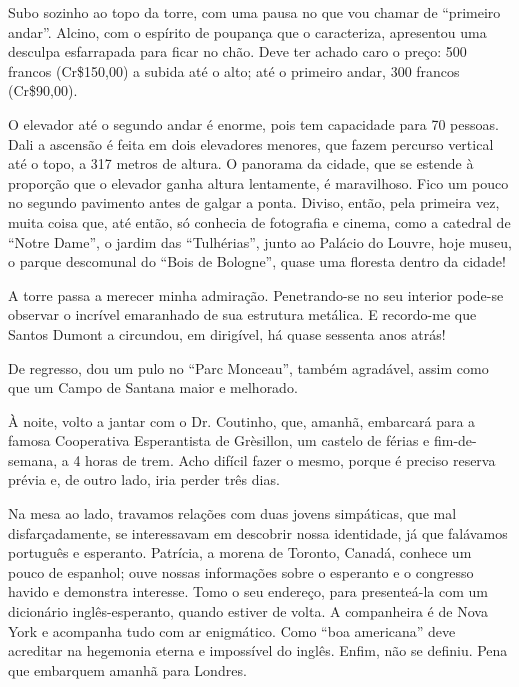 Subo sozinho ao topo da torre, com uma pausa no que vou chamar de ``primeiro andar''. Alcino, com o espírito de poupança que o caracteriza, apresentou uma desculpa esfarrapada para ficar no chão. Deve ter achado caro o preço: 500 francos (Cr\$150,00) a subida até o alto; até o primeiro andar, 300 francos (Cr\$90,00).

O elevador até o segundo andar é enorme, pois tem capacidade para 70 pessoas. Dali a ascensão é feita em dois elevadores menores, que fazem percurso vertical até o topo, a 317 metros de altura. O panorama da cidade, que se estende à proporção que o elevador ganha altura lentamente, é maravilhoso. Fico um pouco no segundo pavimento antes de galgar a ponta. Diviso, então, pela primeira vez, muita coisa que, até então, só conhecia de fotografia e cinema, como a catedral de ``Notre Dame'', o jardim das ``Tulhérias'', junto ao Palácio do Louvre, hoje museu, o parque descomunal do ``Bois de Bologne'', quase uma floresta dentro da cidade!

A torre passa a merecer minha admiração. Penetrando-se no seu interior pode-se observar o incrível emaranhado de sua estrutura metálica. E recordo-me que Santos Dumont a circundou, em dirigível, há quase sessenta anos atrás!

De regresso, dou um pulo no ``Parc Monceau'', também agradável, assim como que um Campo de Santana maior e melhorado.

À noite, volto a jantar com o Dr. Coutinho, que, amanhã, embarcará para a famosa Cooperativa Esperantista de Grèsillon, um castelo de férias e fim-de-semana, a 4 horas de trem. Acho difícil fazer o mesmo, porque é preciso reserva prévia e, de outro lado, iria perder três dias.

Na mesa ao lado, travamos relações com duas jovens simpáticas, que mal disfarçadamente, se interessavam em descobrir nossa identidade, já que falávamos português e esperanto. Patrícia, a morena de Toronto, Canadá, conhece um pouco de espanhol; ouve nossas informações sobre o esperanto e o congresso havido e demonstra interesse. Tomo o seu endereço, para presenteá-la com um dicionário inglês-esperanto, quando estiver de volta. A companheira é de Nova York e acompanha tudo com ar enigmático. Como ``boa americana'' deve acreditar na hegemonia eterna e impossível do inglês. Enfim, não se definiu. Pena que embarquem amanhã para Londres.

